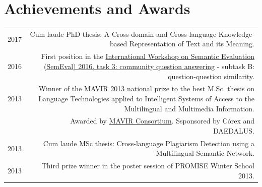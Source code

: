 \documentclass[10pt]{article}
\begin{document}
\section*{Achievements and Awards}
\begin{tabular}{L!{\VRule}R}
  2017 & Cum laude PhD thesis: A Cross-domain and Cross-language Knowledge-based Representation of Text and its Meaning.\vspace{5pt}\\
  2016 & First position in the \href{http://alt.qcri.org/semeval2016/task3/}{International Workshop on Se\-man\-tic Evaluation (SemEval) 2016, task 3: community question answering} - subtask B: question-question similarity.\vspace{5pt}\\
  2013 & Winner of the \href{http://www.mavir.net/premio/182-resuelto-premio-mavir-2013}{MAVIR 2013 national prize} to the best M.Sc. thesis on Language Technologies applied to Intelligent Systems of Access
  to the Multilingual and Multimedia Information.\vspace{5pt}\\
  &\scriptsize{Awarded by \href{http://www.mavir.net/}{MAVIR Consortium}. Ssponsored by C{\'o}rex and DAEDALUS.}\vspace{5pt}\\
  2013 & Cum laude MSc thesis: Cross-language Plagiarism Detection using a Multilingual Se\-man\-tic Network.\vspace{5pt}\\

  2013 & Third prize winner in the poster session of PROMISE Winter School 2013.\vspace{5pt}\\
\end{tabular}
\end{document}
